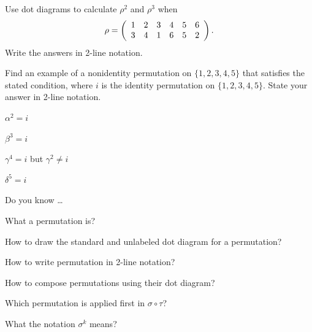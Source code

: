 \begin{exer}[\exerP] %
\label{exer_iterate_rho}
    Use dot diagrams to calculate $\rho^2$ and $\rho^3$ when $$\displaystyle \rho = \left ( \begin{array} {ccc ccc} 1 & 2 & 3 & 4 & 5 & 6 \\ 3 & 4 & 1 & 6 & 5 & 2\\ \end{array} \right ).$$  Write the answers in 2-line notation.
\end{exer}

\begin{exer}[\exerU] %
\label{exer_iterations_perms}
    Find an example of a nonidentity permutation on $\{1,2,3,4,5\}$ that satisfies the stated condition, where $i$ is the identity permutation on $\{1,2,3,4,5\}$. State your answer in 2-line notation.
        \begin{exerpart}
            \item $\alpha^2=i$
            \item $\beta^3 =  i$
            \item $\gamma^4=i$ but $\gamma^2 \neq i$
            \item $\delta^5 =i$
        \end{exerpart}
\end{exer}

\begin{exer}[\exerR] %
\label{exer_dyk_permutations}
    Do you know \ldots
        \begin{exerpart}
            \item What a permutation is?
            \item How to draw the standard and unlabeled dot diagram for a permutation?
            \item How to write permutation in 2-line notation?
            \item How to compose permutations using their dot diagram?
            \item Which permutation is applied first in $\sigma \circ \tau$?
            \item What the notation $\sigma^k$ means? 
        \end{exerpart}
\end{exer}

